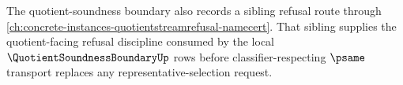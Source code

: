 The quotient-soundness boundary also records a sibling refusal route through \autoref{ch:concrete-instances-quotientstreamrefusal-namecert}. That sibling supplies the quotient-facing refusal discipline consumed by the local $\QuotientSoundnessBoundaryUp$ rows before classifier-respecting $\psame$ transport replaces any representative-selection request.
